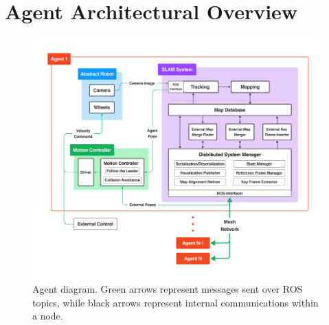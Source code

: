 






\label{sec:3}

\section{Agent Architectural Overview}
\label{sec:architectural-overview}

\begin{figure}[h]
    \centering
    \includegraphics[trim=5cm 5cm 5cm 5cm, scale=0.2]{figures/agent_diagram.pdf}
    \caption{Agent diagram. Green arrows represent messages sent over ROS topics, while black arrows represent internal communications within a node.}
    \label{fig:agent-diagram}
\end{figure}

